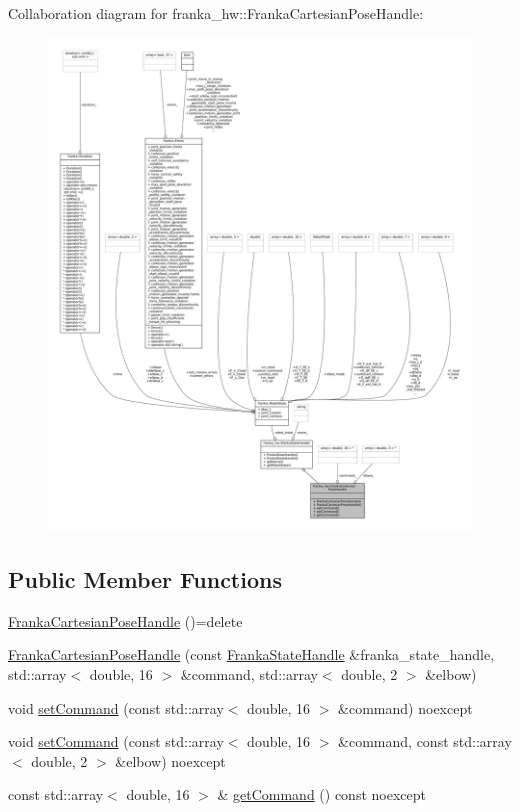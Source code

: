 Collaboration diagram for franka\+\_\+hw\+:\+:Franka\+Cartesian\+Pose\+Handle\+:
\nopagebreak
\begin{figure}[H]
\begin{center}
\leavevmode
\includegraphics[width=350pt]{classfranka__hw_1_1FrankaCartesianPoseHandle__coll__graph}
\end{center}
\end{figure}
\subsection*{Public Member Functions}
\begin{DoxyCompactItemize}
\item 
\hyperlink{classfranka__hw_1_1FrankaCartesianPoseHandle_ad1813fa7937997edc506dc95dbf35b40}{Franka\+Cartesian\+Pose\+Handle} ()=delete
\item 
\hyperlink{classfranka__hw_1_1FrankaCartesianPoseHandle_a98190bd982c26fdf1d90fbec701ffb06}{Franka\+Cartesian\+Pose\+Handle} (const \hyperlink{classfranka__hw_1_1FrankaStateHandle}{Franka\+State\+Handle} \&franka\+\_\+state\+\_\+handle, std\+::array$<$ double, 16 $>$ \&command, std\+::array$<$ double, 2 $>$ \&elbow)
\item 
void \hyperlink{classfranka__hw_1_1FrankaCartesianPoseHandle_a37b091755da28b088892e79c984e0634}{set\+Command} (const std\+::array$<$ double, 16 $>$ \&command) noexcept
\item 
void \hyperlink{classfranka__hw_1_1FrankaCartesianPoseHandle_a0a10bbd38414170da45412dc803cb428}{set\+Command} (const std\+::array$<$ double, 16 $>$ \&command, const std\+::array$<$ double, 2 $>$ \&elbow) noexcept
\item 
const std\+::array$<$ double, 16 $>$ \& \hyperlink{classfranka__hw_1_1FrankaCartesianPoseHandle_a844b5a45c8a54f6930c23d0161fdc30d}{get\+Command} () const noexcept
\end{DoxyCompactItemize}
